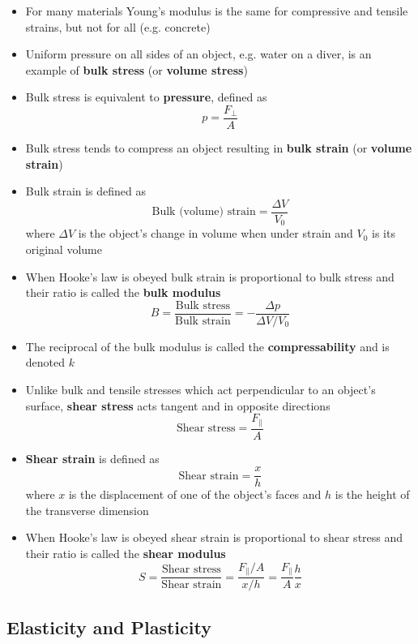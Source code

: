 \documentclass{article}
\begin{document}
\begin{itemize}
  \item For many materials Young's modulus is the same for compressive and tensile strains, but not for all (e.g. concrete)

  \item Uniform pressure on all sides of an object, e.g. water on a diver, is an example of \textbf{bulk stress} (or \textbf{volume stress})

  \item Bulk stress is equivalent to \textbf{pressure}, defined as \[p=\frac{F_\perp}{A}\]

  \item Bulk stress tends to compress an object resulting in \textbf{bulk strain} (or \textbf{volume strain})

  \item Bulk strain is defined as \[\textrm{Bulk (volume) strain} = \frac{\Delta V}{V_0}\] where $\Delta V$ is the object's change in volume when under strain and $V_0$ is its original volume

  \item When Hooke's law is obeyed bulk strain is proportional to bulk stress and their ratio is called the \textbf{bulk modulus} \[B = \frac{\textrm{Bulk stress}}{\textrm{Bulk strain}} = - \frac{\Delta p}{\Delta V / V_0}\]

  \item The reciprocal of the bulk modulus is called the \textbf{compressability} and is denoted $k$

  \item Unlike bulk and tensile stresses which act perpendicular to an object's surface, \textbf{shear stress} acts tangent and in opposite directions \[\textrm{Shear stress} = \frac{F_\parallel}{A}\]

  \item \textbf{Shear strain} is defined as \[\textrm{Shear strain} = \frac{x}{h}\] where $x$ is the displacement of one of the object's faces and $h$ is the height of the transverse dimension

  \item When Hooke's law is obeyed shear strain is proportional to shear stress and their ratio is called the \textbf{shear modulus} \[S=\frac{\textrm{Shear stress}}{\textrm{Shear strain}}=\frac{F_\parallel / A}{x / h} = \frac{F_\parallel}{A}\frac{h}{x}\]
\end{itemize}

\subsection{Elasticity and Plasticity}
\end{document}
